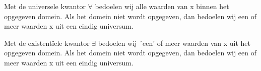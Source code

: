 \documentclass{article}
\begin{document}
	
	
	Met de universele kwantor $\forall$  bedoelen wij alle waarden van x binnen het opgegeven
	domein. Als het domein niet wordt opgegeven, dan bedoelen wij een of meer waarden x
	uit een eindig universum. 
	
	
	Met de existentïele kwantor $\exists$ bedoelen wij ´een' of meer waarden van x uit het opgegeven
	domein. Als het domein niet wordt opgegeven, dan bedoelen wij een of meer waarden x
	uit een eindig universum. 
	
	
	
\end{document}

